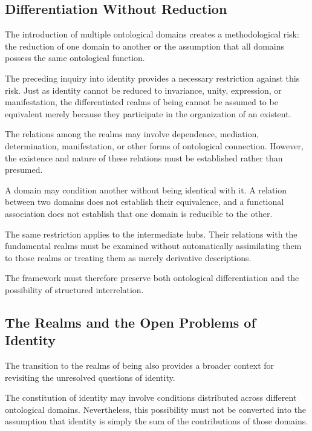 \subsection{Differentiation Without Reduction}

The introduction of multiple ontological domains
creates a methodological risk: the reduction of
one domain to another or the assumption that
all domains possess the same ontological function.

The preceding inquiry into identity provides a
necessary restriction against this risk. Just as
identity cannot be reduced to invariance, unity,
expression, or manifestation, the differentiated
realms of being cannot be assumed to be equivalent
merely because they participate in the organization
of an existent.

The relations among the realms may involve
dependence, mediation, determination, manifestation,
or other forms of ontological connection. However,
the existence and nature of these relations must
be established rather than presumed.

A domain may condition another without being
identical with it. A relation between two domains
does not establish their equivalence, and a
functional association does not establish that
one domain is reducible to the other.

The same restriction applies to the intermediate
hubs. Their relations with the fundamental realms
must be examined without automatically assimilating
them to those realms or treating them as merely
derivative descriptions.

The framework must therefore preserve both
ontological differentiation and the possibility
of structured interrelation.


\subsection{The Realms and the Open Problems of Identity}

The transition to the realms of being also provides
a broader context for revisiting the unresolved
questions of identity.

The constitution of identity may involve conditions
distributed across different ontological domains.
Nevertheless, this possibility must not be converted
into the assumption that identity is simply the
sum of the contributions of those domains.

